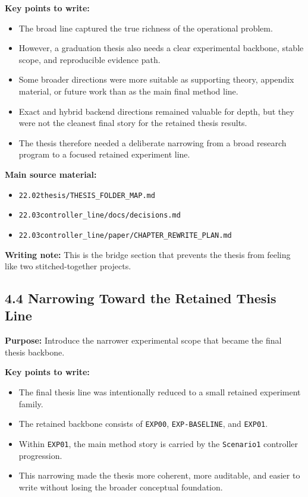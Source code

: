 \textbf{Key points to write:}
\begin{itemize}
    \item The broad line captured the true richness of the operational problem.
    \item However, a graduation thesis also needs a clear experimental backbone, stable scope, and reproducible evidence path.
    \item Some broader directions were more suitable as supporting theory, appendix material, or future work than as the main final method line.
    \item Exact and hybrid backend directions remained valuable for depth, but they were not the cleanest final story for the retained thesis results.
    \item The thesis therefore needed a deliberate narrowing from a broad research program to a focused retained experiment line.
\end{itemize}

\textbf{Main source material:}
\begin{itemize}
    \item \texttt{22.02thesis/THESIS\_FOLDER\_MAP.md}
    \item \texttt{22.03controller_line/docs/decisions.md}
    \item \texttt{22.03controller_line/paper/CHAPTER\_REWRITE\_PLAN.md}
\end{itemize}

\textbf{Writing note:} This is the bridge section that prevents the thesis from feeling like two stitched-together projects.

\subsection*{4.4 Narrowing Toward the Retained Thesis Line}
\textbf{Purpose:} Introduce the narrower experimental scope that became the final thesis backbone.

\textbf{Key points to write:}
\begin{itemize}
    \item The final thesis line was intentionally reduced to a small retained experiment family.
    \item The retained backbone consists of \texttt{EXP00}, \texttt{EXP-BASELINE}, and \texttt{EXP01}.
    \item Within \texttt{EXP01}, the main method story is carried by the \texttt{Scenario1} controller progression.
    \item This narrowing made the thesis more coherent, more auditable, and easier to write without losing the broader conceptual foundation.
\end{itemize}

